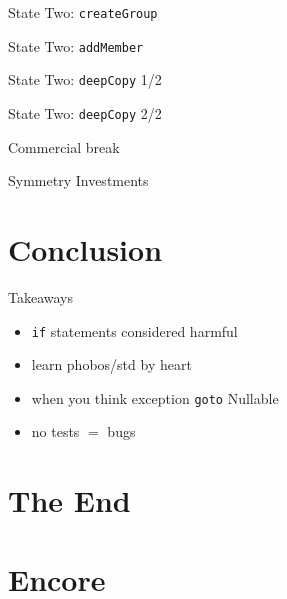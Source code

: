 \documentclass[aspectratio=169,notes]{beamer}
\begin{document}
	\begin{frame}[fragile]{State Two: \lstinline{createGroup}}
		
	\end{frame}

	\begin{frame}[fragile]{State Two: \lstinline{addMember}}
		
	\end{frame}

	\begin{frame}[fragile]{State Two: \lstinline{deepCopy} 1/2}
		
	\end{frame}

	\begin{frame}[fragile]{State Two: \lstinline{deepCopy} 2/2}
		
	\end{frame}

	\begin{frame}[fragile]{Commercial break}
		\begin{center}
			{\Large Symmetry Investments}
		\end{center}
	\end{frame}

	\section{Conclusion}
	\begin{frame}[fragile]{Takeaways}
		\begin{itemize}
			\item \lstinline{if} statements considered harmful
			\item learn phobos/std by heart
			\item when you think exception \lstinline{goto} Nullable
			\item no tests $=$ bugs
		\end{itemize}
	\end{frame}

	\section{The End}

	\section{Encore}
\end{document}
